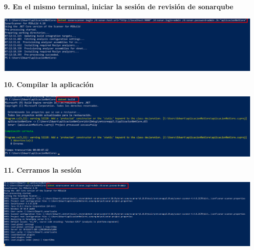 \documentclass{article}
\begin{document}
\textbf{9. En el mismo terminal, iniciar la sesión de revisión de sonarqube}

   \begin{center}
		\includegraphics[width=15cm]{./images/9} 
	\end{center}


\textbf{10. Compilar la aplicación}

    \begin{center}
		\includegraphics[width=15cm]{./images/10} 
	\end{center}
	
	
\textbf{11. Cerramos la sesión}

    \begin{center}
		\includegraphics[width=15cm]{./images/11} 
	\end{center}


   
\end{document}
